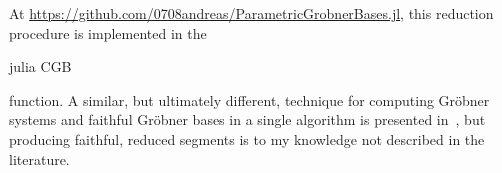 \begin{remark}
  At \url{https://github.com/0708andreas/ParametricGrobnerBases.jl}, this reduction procedure is implemented in the \begin{mintinline}{julia} CGB \end{mintinline} function. A similar, but ultimately different, technique for computing Gröbner systems and faithful Gröbner bases in a single algorithm is presented in~\cite{10.1145/1993886.1993918}, but producing faithful, reduced segments is to my knowledge not described in the literature.

\end{remark}
